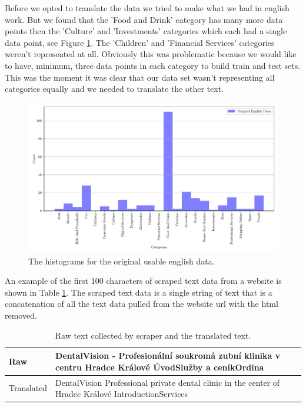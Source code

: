 Before we opted to translate the data we tried to make what we had in english work. But we found that the 'Food and Drink' category has many more data points then the 'Culture' and 'Investments' categories which each had a single data point, see Figure \ref{fig:original_english_counts}. The 'Children' and 'Financial Services' categories weren't represented at all. Obviously this was problematic because we would like to have, minimum, three data points in each category to build train and test sets. This was the moment it was clear that our data set wasn't representing all categories equally and we needed to translate the other text.

\begin{figure}[!ht]
  \centering
  \includegraphics[width=\textwidth]{../img/plot_original_english_counts}
  \caption{The histograms for the original usable english data.}
  \label{fig:original_english_counts}
\end{figure}

An example of the first 100 characters of scraped text data from a website is shown in Table \ref{tab:text_examples}. The scraped text data is a single string of text that is a concatenation of all the text data pulled from the website url with the html removed. 

\begin{table}[!ht]
\centering
\caption{Raw text collected by scraper and the translated text.}
\begin{tabular}{|l|p{10cm}|}
\hline
Raw & DentalVision - Profesionální soukromá zubní klinika v centru Hradce Králové ÚvodSlužby a ceníkOrdina \\ \hline
Translated & DentalVision Professional private dental clinic in the center of Hradec Králové IntroductionServices \\ \hline
\end{tabular}
\label{tab:text_examples}
\end{table}

